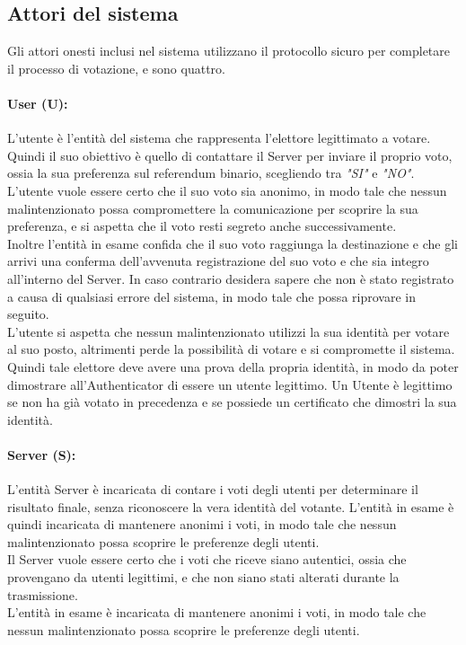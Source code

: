 \subsection{Attori del sistema}
	Gli attori onesti inclusi nel sistema utilizzano il protocollo sicuro per completare il processo di votazione, e sono quattro.
	\paragraph{User (U):}
		L'utente è l'entità del sistema che rappresenta l'elettore legittimato a votare. Quindi il suo obiettivo è quello di contattare il Server per inviare il proprio voto, ossia la sua preferenza sul referendum binario, scegliendo tra \textit{"SI"} e \textit{"NO"}.\\
		L'utente vuole essere certo che il suo voto sia anonimo, in modo tale che nessun malintenzionato possa compromettere la comunicazione per scoprire la sua preferenza, e si aspetta che il voto resti segreto anche successivamente.\\
		Inoltre l'entità in esame confida che il suo voto raggiunga la destinazione e che gli arrivi una conferma dell'avvenuta registrazione del suo voto e che sia integro all'interno del Server. In caso contrario desidera sapere che non è stato registrato a causa di qualsiasi errore del sistema, in modo tale che possa riprovare in seguito.\\
		L'utente si aspetta che nessun malintenzionato utilizzi la sua identità per votare al suo posto, altrimenti perde la possibilità di votare e si compromette il sistema.\\
		Quindi tale elettore deve avere una prova della propria identità, in modo da poter dimostrare all'Authenticator di essere un utente legittimo. Un Utente è legittimo se non ha già votato in precedenza e se possiede un certificato che dimostri la sua identità.
	
	\paragraph{Server (S):}
		L'entità Server è incaricata di contare i voti degli utenti per determinare il risultato finale, senza riconoscere la vera identità del votante. L'entità in esame è quindi incaricata di mantenere anonimi i voti, in modo tale che nessun malintenzionato possa scoprire le preferenze degli utenti.\\
		Il Server vuole essere certo che i voti che riceve siano autentici, ossia che provengano da utenti legittimi, e che non siano stati alterati durante la trasmissione.\\
		L'entità in esame è incaricata di mantenere anonimi i voti, in modo tale che nessun malintenzionato possa scoprire le preferenze degli utenti.
	
